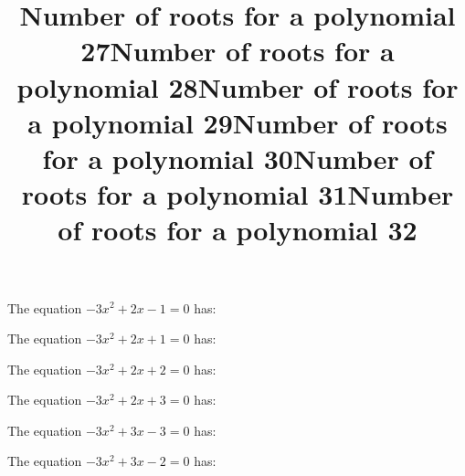 \documentclass{article}
\begin{document}
\begin{category}
\begin{question}[multichoice]

\end{question}
\begin{question}[multichoice]
\title{Number of roots for a polynomial 27}
The equation $- 3 x^{2} + 2 x - 1=0$ has:


\end{question}
\begin{question}[multichoice]
\title{Number of roots for a polynomial 28}
The equation $- 3 x^{2} + 2 x + 1=0$ has:


\end{question}
\begin{question}[multichoice]
\title{Number of roots for a polynomial 29}
The equation $- 3 x^{2} + 2 x + 2=0$ has:


\end{question}
\begin{question}[multichoice]
\title{Number of roots for a polynomial 30}
The equation $- 3 x^{2} + 2 x + 3=0$ has:


\end{question}
\begin{question}[multichoice]
\title{Number of roots for a polynomial 31}
The equation $- 3 x^{2} + 3 x - 3=0$ has:


\end{question}
\begin{question}[multichoice]
\title{Number of roots for a polynomial 32}
The equation $- 3 x^{2} + 3 x - 2=0$ has:



\end{question}
\end{category}
\end{document}
